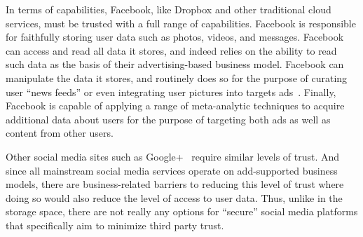 In terms of capabilities, Facebook, like Dropbox and other traditional
cloud services, must be trusted with a full range of capabilities.
Facebook is responsible for faithfully storing user data such as
photos, videos, and messages. Facebook can access and read all data it
stores, and indeed relies on the ability to read such data as the
basis of their advertising-based business model. Facebook can
manipulate the data it stores, and routinely does so for the purpose
of curating user ``news feeds'' or even integrating user pictures into
targets ads~\cite{mashable-socialads}. Finally, Facebook is capable of
applying a range of meta-analytic techniques to acquire additional
data about users for the purpose of targeting both ads as well as
content from other users.

Other social media sites such as Google+~\cite{google-plus}
require similar levels of trust. And since all mainstream social media
services operate on add-supported business models, there are
business-related barriers to reducing this level of trust where doing
so would also reduce the level of access to user data. Thus, unlike in
the storage space, there are not really any options for ``secure''
social media platforms that specifically aim to minimize third party
trust.





